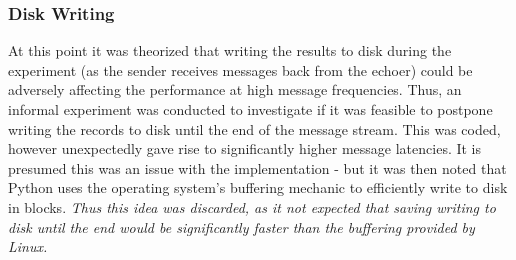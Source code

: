 \documentclass[../dissertation.tex]{subfiles}
\begin{document}
\subsubsection{Disk Writing}

At this point it was theorized that writing the results to disk during the experiment (as the sender receives messages back from the echoer) could be adversely affecting the performance at high message frequencies. Thus, an informal experiment was conducted to investigate if it was feasible to postpone writing the records to disk until the end of the message stream. This was coded\cite{Experiment1NoDiskWriteCode}, however unexpectedly gave rise to significantly higher message latencies. It is presumed this was an issue with the implementation - but it was then noted that Python uses the operating system's buffering mechanic to efficiently write to disk in blocks. \textit{Thus this idea was discarded, as it not expected that saving writing to disk until the end would be significantly faster than the buffering provided by Linux.}
\end{document}
